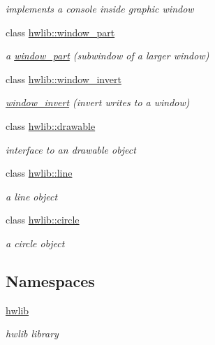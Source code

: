 \begin{DoxyCompactItemize}
\begin{DoxyCompactList}\small\item\em implements a console inside graphic window \end{DoxyCompactList}\item 
class \hyperlink{classhwlib_1_1window__part}{hwlib\+::window\+\_\+part}
\begin{DoxyCompactList}\small\item\em a \hyperlink{classhwlib_1_1window__part}{window\+\_\+part} (subwindow of a larger window) \end{DoxyCompactList}\item 
class \hyperlink{classhwlib_1_1window__invert}{hwlib\+::window\+\_\+invert}
\begin{DoxyCompactList}\small\item\em \hyperlink{classhwlib_1_1window__invert}{window\+\_\+invert} (invert writes to a window) \end{DoxyCompactList}\item 
class \hyperlink{classhwlib_1_1drawable}{hwlib\+::drawable}
\begin{DoxyCompactList}\small\item\em interface to an drawable object \end{DoxyCompactList}\item 
class \hyperlink{classhwlib_1_1line}{hwlib\+::line}
\begin{DoxyCompactList}\small\item\em a line object \end{DoxyCompactList}\item 
class \hyperlink{classhwlib_1_1circle}{hwlib\+::circle}
\begin{DoxyCompactList}\small\item\em a circle object \end{DoxyCompactList}\end{DoxyCompactItemize}
\subsection*{Namespaces}
\begin{DoxyCompactItemize}
\item 
 \hyperlink{namespacehwlib}{hwlib}
\begin{DoxyCompactList}\small\item\em hwlib library \end{DoxyCompactList}\end{DoxyCompactItemize}
